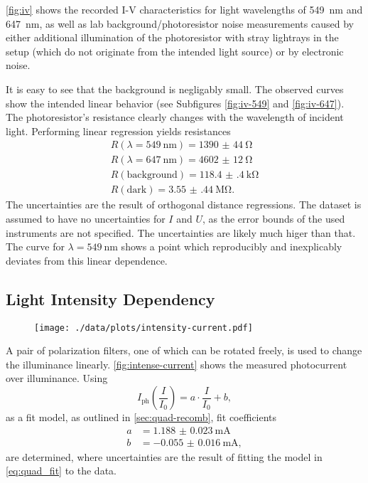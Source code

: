 \autoref{fig:iv} shows the recorded I-V characteristics for light wavelengths of \SI{549}{\nm} and \SI{647}{\nm}, as well as lab background/photoresistor noise measurements caused by either additional illumination of the photoresistor with stray lightrays in the setup (which do not originate from the intended light source) or by electronic noise.

It is easy to see that the background is negligably small.
The observed curves show the intended linear behavior (see Subfigures \ref{fig:iv-549} and \ref{fig:iv-647}).
The photoresistor's resistance clearly changes with the wavelength of incident light.
Performing linear regression yields resistances
\begin{align*}
  R(\lambda = \SI{549}{\nm}) = \SI{1390(44)}{\ohm} \\
  R(\lambda = \SI{647}{\nm}) = \SI{4602(12)}{\ohm} \\
  R(\text{background}) = \SI{118.4(4)}{\kilo\ohm} \\
  R(\text{dark}) = \SI{3.55(44)}{\mega\ohm}.
\end{align*}
The uncertainties are the result of orthogonal distance regressions.
The dataset is assumed to have no uncertainties for $I$ and $U$, as the error bounds of the used instruments are not specified.
The uncertainties are likely much higer than that.
The curve for $\lambda=\SI{549}{\nm}$ shows a point which reproducibly and inexplicably deviates from this linear dependence.

\subsection{Light Intensity Dependency}
\begin{figure}
	\centering
	\texttt{[image: ./data/plots/intensity-current.pdf]}
	\label{fig:intense-current}
\end{figure}
A pair of polarization filters, one of which can be rotated freely, is used to change the illuminance linearly.
\autoref{fig:intense-current} shows the measured photocurrent over illuminance.
Using
\begin{equation}\label{eq:quad_fit}
	I_\text{ph}\left(\frac{I}{I_0}\right) = a\cdot\frac{I}{I_0} + b,
\end{equation}
as a fit model, as outlined in \autoref{sec:quad-recomb}, fit coefficients
\begin{align*}
	a &= \SI{1.188(23)}{\mA}	\\
	b &= \SI{-0.055(16)}{\mA},
\end{align*}
are determined, where uncertainties are the result of fitting the model in \autoref{eq:quad_fit} to the data.

